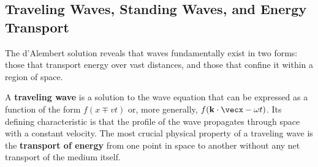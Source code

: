 \subsection{Traveling Waves, Standing Waves, and Energy Transport}
The d'Alembert solution reveals that waves fundamentally exist in two forms: those that transport energy over vast distances, and those that confine it within a region of space.

\begin{definition}
A \textbf{traveling wave} is a solution to the wave equation that can be expressed as a function of the form $f(x \mp vt)$ or, more generally, $f(\vecbf{k} \cdot \vecx - \omega t)$. Its defining characteristic is that the profile of the wave propagates through space with a constant velocity. The most crucial physical property of a traveling wave is the \textbf{transport of energy} from one point in space to another without any net transport of the medium itself.
\end{definition}

